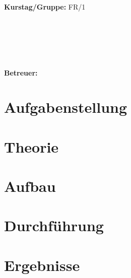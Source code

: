 \documentclass{article}
\begin{document}
\begin{verbatim}


\end{verbatim}
			\begin{flushleft}
			\textbf{\Large{Kurstag/Gruppe:}} \Large{FR/1}
			\end{flushleft}

\begin{verbatim}






\end{verbatim}
			\begin{flushleft}
			\LARGE{\textbf{Betreuer:\Large{ }}}		
			\end{flushleft}
			
\section{Aufgabenstellung}

\section{Theorie}
\subsection{}

\section{Aufbau}

\section{Durchführung}

\section{Ergebnisse}
\end{document}
